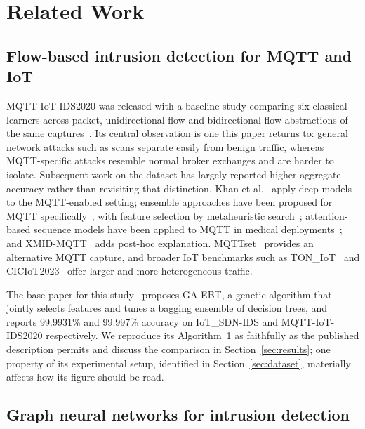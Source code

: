 \section{Related Work}
\label{sec:related}

\subsection{Flow-based intrusion detection for MQTT and IoT}

MQTT-IoT-IDS2020 was released with a baseline study comparing six classical
learners across packet, unidirectional-flow and bidirectional-flow abstractions
of the same captures~\cite{hindy2020mqttcase}. Its central observation is one
this paper returns to: general network attacks such as scans separate easily
from benign traffic, whereas MQTT-specific attacks resemble normal broker
exchanges and are harder to isolate. Subsequent work on the dataset has
largely reported higher aggregate accuracy rather than revisiting that
distinction. Khan et al.~\cite{khan2021mqttdl} apply deep models to the
MQTT-enabled setting; ensemble approaches have been proposed for MQTT
specifically~\cite{mqttensemble2025,mqttsecuring2023}, with feature selection
by metaheuristic search~\cite{mqttlightgbm2022}; attention-based sequence
models have been applied to MQTT in medical
deployments~\cite{mqttiomt2026}; and XMID-MQTT~\cite{xmidmqtt2025} adds
post-hoc explanation. MQTTset~\cite{vaccari2020mqttset} provides an
alternative MQTT capture, and broader IoT benchmarks such as
TON\_IoT~\cite{moustafa2021toniot} and CICIoT2023~\cite{neto2023ciciot} offer
larger and more heterogeneous traffic.

The base paper for this study~\cite{norouzi2026reliable} proposes GA-EBT, a
genetic algorithm that jointly selects features and tunes a bagging ensemble of
decision trees, and reports 99.9931\% and 99.997\% accuracy on IoT\_SDN-IDS and
MQTT-IoT-IDS2020 respectively. We reproduce its Algorithm~1 as faithfully as
the published description permits and discuss the comparison in
Section~\ref{sec:results}; one property of its experimental setup, identified in
Section~\ref{sec:dataset}, materially affects how its figure should be read.

\subsection{Graph neural networks for intrusion detection}

